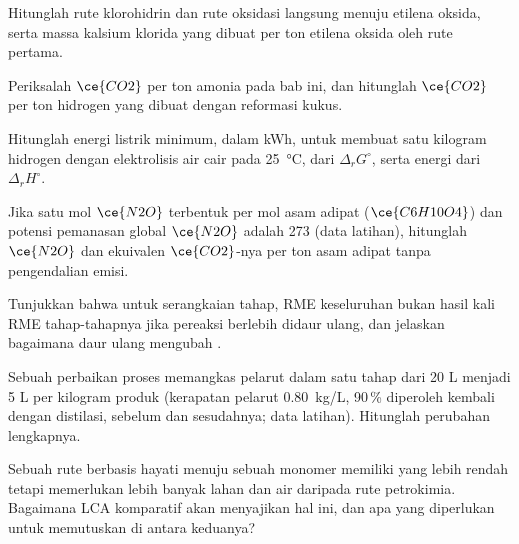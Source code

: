 \begin{exercise}[$\star\star$]\label{exo:b3:green-industrial:6}
Hitunglah  rute klorohidrin dan rute oksidasi langsung menuju
etilena oksida, serta massa kalsium klorida yang dibuat per ton etilena oksida
oleh rute pertama.
\end{exercise}

\begin{exercise}[$\star\star$]\label{exo:b3:green-industrial:7}
Periksalah $\ce{CO2}$ per ton amonia pada bab ini, dan hitunglah $\ce{CO2}$ per ton
hidrogen yang dibuat dengan reformasi kukus.
\end{exercise}

\begin{exercise}[$\star\star$]\label{exo:b3:green-industrial:8}
Hitunglah energi listrik minimum, dalam kWh, untuk membuat satu kilogram hidrogen dengan
elektrolisis air cair pada \qty{25}{\celsius}, dari $\Delta_rG^\circ$, serta energi dari $\Delta_rH^\circ$.
\end{exercise}

\begin{exercise}[$\star\star$]\label{exo:b3:green-industrial:9}
Jika satu mol $\ce{N2O}$ terbentuk per mol asam adipat ($\ce{C6H10O4}$) dan potensi pemanasan global
$\ce{N2O}$ adalah 273 (data latihan), hitunglah $\ce{N2O}$ dan ekuivalen $\ce{CO2}$-nya
per ton asam adipat tanpa pengendalian emisi.
\end{exercise}

\begin{exercise}[$\star\star\star$]\label{exo:b3:green-industrial:10}
Tunjukkan bahwa untuk serangkaian tahap, RME keseluruhan bukan hasil kali RME
tahap-tahapnya jika pereaksi berlebih didaur ulang, dan jelaskan bagaimana daur ulang mengubah
.
\end{exercise}

\begin{exercise}[$\star\star\star$]\label{exo:b3:green-industrial:11}
Sebuah perbaikan proses memangkas pelarut dalam satu tahap dari 20 L menjadi 5 L per kilogram
produk (kerapatan pelarut \qty{0.80}{kg/L}, 90\,\% diperoleh kembali dengan distilasi, sebelum dan sesudahnya; data
latihan). Hitunglah perubahan  lengkapnya.
\end{exercise}

\begin{exercise}[$\star\star\star$]\label{exo:b3:green-industrial:12}
Sebuah rute berbasis hayati menuju sebuah monomer memiliki  yang lebih rendah tetapi memerlukan lebih banyak lahan
dan air daripada rute petrokimia. Bagaimana LCA komparatif akan menyajikan hal ini,
dan apa yang diperlukan untuk memutuskan di antara keduanya?
\end{exercise}

